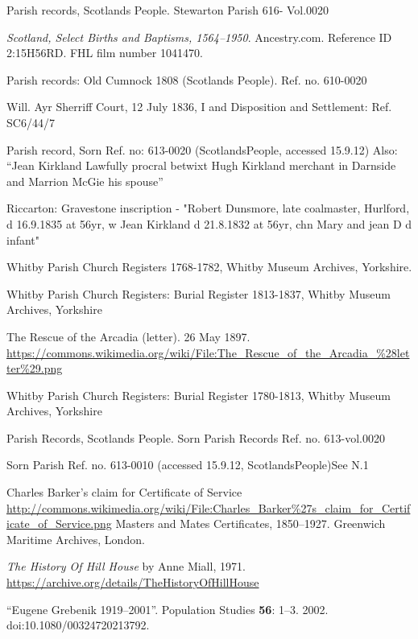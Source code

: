 \begin{thebibliography}{99}
	Parish records, Scotlands People. Stewarton Parish 616- Vol.0020

	\emph{Scotland, Select Births and Baptisms, 1564--1950}.
	Ancestry.com.
	Reference ID 2:15H56RD. FHL film number 1041470.

	Parish records: Old Cumnock 1808 (Scotlands People). Ref. no. 610-0020

	 Will. Ayr Sherriff Court, 12 July 1836, I and Disposition and Settlement: Ref. SC6/44/7
 
	Parish record, Sorn Ref. no: 613-0020 (ScotlandsPeople, accessed 15.9.12)
	Also: ``Jean Kirkland Lawfully procral betwixt Hugh Kirkland merchant in Darnside and Marrion McGie his spouse''

	Riccarton: Gravestone inscription - "Robert Dunsmore, late coalmaster, Hurlford, d 16.9.1835 at 56yr,
	w Jean Kirkland d 21.8.1832 at 56yr, chn Mary and jean D d infant"

	Whitby Parish Church Registers 1768-1782, Whitby Museum Archives, Yorkshire.

	Whitby Parish Church Registers: Burial Register 1813-1837, Whitby Museum Archives, Yorkshire

	The Rescue of the Arcadia (letter). 26 May 1897.
	\url{https://commons.wikimedia.org/wiki/File:The_Rescue_of_the_Arcadia_\%28letter\%29.png}

	Whitby Parish Church Registers: Burial Register 1780-1813, Whitby Museum Archives, Yorkshire

	Parish Records, Scotlands People. Sorn Parish Records Ref. no. 613-vol.0020

	Sorn Parish Ref. no. 613-0010 (accessed 15.9.12, ScotlandsPeople)See N.1

	Charles Barker's claim for Certificate of Service
	\url{http://commons.wikimedia.org/wiki/File:Charles_Barker\%27s_claim_for_Certificate_of_Service.png}
	Masters and Mates Certificates, 1850--1927. Greenwich Maritime Archives, London.

	\emph{The History Of Hill House} by Anne Miall, 1971.
	\url{https://archive.org/details/TheHistoryOfHillHouse}

``Eugene Grebenik 1919--2001''. Population Studies \textbf{56}: 1--3. 2002. doi:10.1080/00324720213792.


\end{thebibliography}
